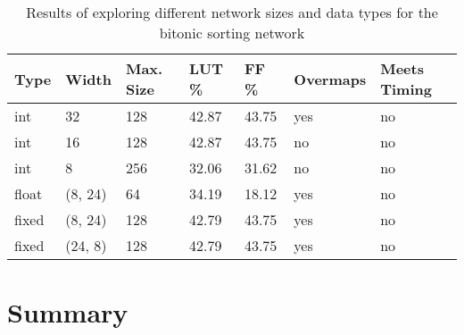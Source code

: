\begin{table}[!ht]
  \begin{tabularx}{\textwidth}{X | X | X | X | X | p{2cm} |  X}
    \textbf{Type} & \textbf{Width} & \textbf{Max. Size} & \textbf{LUT \%} & \textbf{FF \%} & \textbf{Overmaps} & \textbf{Meets Timing} \\
    \hline
    \hline
    int           & 32             & 128                & 42.87           & 43.75          & yes               & no                    \\
    int           & 16             & 128                & 42.87           & 43.75          & no                & no                    \\
    int           & 8              & 256                & 32.06           & 31.62          & no                & no                    \\
    float         & (8, 24)        & 64                 & 34.19           & 18.12          & yes               & no                    \\
    fixed         & (8, 24)        & 128                & 42.79           & 43.75          & yes               & no                    \\
    fixed         & (24, 8)        & 128                & 42.79           & 43.75          & yes               & no                    \\
  \end{tabularx}
  \caption{Results of exploring different network sizes and data types for the bitonic sorting network}
  \label{table:bsort-bitwidth}
\end{table}

\section{Summary}
